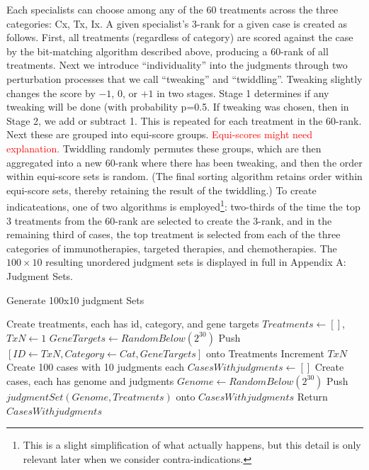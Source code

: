 \documentclass{article}
\begin{document}
Each specialists can choose among any of the 60 treatments across the three categories: Cx, Tx, Ix. A given specialist's 3-rank for a given case is created as follows. First, all treatments (regardless of category) are scored against the case by the bit-matching algorithm described above, producing a 60-rank of all treatments. Next we introduce ``individuality'' into the judgments through two perturbation processes that we call ``tweaking'' and ``twiddling''. Tweaking slightly changes the score by $-1$, $0$, or $+1$ in two stages. Stage 1 determines if any tweaking will be done (with probability p=0.5. If tweaking was chosen, then in Stage 2, we add or subtract 1. This is repeated for each treatment in the 60-rank. Next these are grouped into equi-score groups. \textcolor{red}{Equi-scores might need explanation.} Twiddling randomly permutes these groups, which are then aggregated into a new 60-rank where there has been tweaking, and then the order within equi-score sets is random. (The final sorting algorithm retains order within equi-score sets, thereby retaining the result of the twiddling.) To create indicateations, one of two algorithms is employed\footnote{This is a slight simplification of what actually happens, but this detail is only relevant later when we consider contra-indications.}: two-thirds of the time the top 3 treatments from the 60-rank are selected to create the 3-rank, and in the remaining third of cases, the top treatment is selected from each of the three categories of immunotherapies, targeted therapies, and chemotherapies. The $100 \times 10$ resulting unordered judgment sets is displayed in full in Appendix A: Judgment Sets.

\begin{algorithm}
	\caption{Generate 100x10 judgment Sets} 
	\begin{algorithmic}[1]
		\State Create treatments, each has id, category, and gene targets
	    \State $Treatments\leftarrow []$, $TxN\leftarrow 1$
		        \State $GeneTargets\leftarrow RandomBelow(2^{30})$
		        \State Push $[ID\leftarrow TxN, Category\leftarrow Cat, GeneTargets]$ onto Treatments
		        \State Increment $TxN$
		    \EndFor
		\EndFor
		\State Create 100 cases with 10 judgments each
	    \State $CasesWithjudgments\leftarrow []$
	    	\State Create cases, each has genome and judgments
	    	\State $Genome\leftarrow RandomBelow(2^{30})$
    	    \State Push $judgmentSet(Genome,Treatments)$ onto $CasesWithjudgments$
		\EndFor
	\State Return $CasesWithjudgments$
	\end{algorithmic} 
\end{algorithm}
\end{document}
